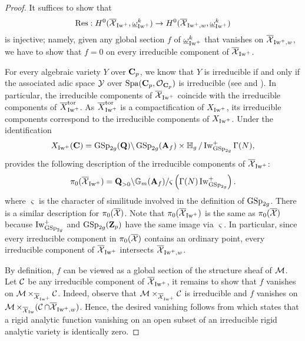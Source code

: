 \begin{proof}
It suffices to show that 
$$\Res: H^0(\overline{\calX}_{\Iw^+}, \underline{\omega}_{\Iw^+}^k)\rightarrow H^0(\overline{\calX}_{\Iw^+, w}, \underline{\omega}_{\Iw^+}^k)$$
is injective; namely, given any global section $f$ of $\underline{\omega}_{\Iw^+}^k$ that vanishes on $\overline{\calX}_{\Iw^+, w}$, we have to show that $f = 0$ on every irreducible component of $\overline{\calX}_{\Iw^+}$.

For every algebraic variety $Y$ over $\C_p$, we know that $Y$ is irreducible if and only if the associated adic space $\calY$ over $\Spa(\C_p, \calO_{\C_p})$ is irreducible (see \cite[Theorem 2.3.1]{conrad-conn} and \cite[\S 1.1.11.(c)]{Huber-2013}). In particular, the irreducible components of $\overline{\calX}_{\Iw^+}$ coincide with the irreducible components of $\overline{X}_{\Iw^+}^{\tor}$. As $\overline{X}_{\Iw^+}^{\tor}$ is a compactification of $X_{\Iw^+}$, its irreducible components correspond to the irreducible components of $X_{\Iw^+}$. Under the identification \[
    X_{\Iw^+}(\C) = \GSp_{2g}(\Q)\backslash \GSp_{2g}(\A_f)\times \bbH_g/\Iw_{\GSp_{2g}}^+\Gamma(N),
\] \cite[\S 2]{Deligne-Shimura} provides the following description of the irreducible components of $\overline{\calX}_{\Iw^+}$:
\[
\pi_0(\overline{\calX}_{\Iw^+}) =  {\Q_{>0}}\backslash \mathbb{G}_m(\A_f)/ \varsigma\left(\Gamma(N) \Iw_{\GSp_{2g}}^+\right).
\]
where $\varsigma$ is the character of similitude involved in the definition of $\GSp_{2g}$. There is a similar description for $\pi_0(\overline{\calX})$. Note that $\pi_0(\overline{\calX}_{\Iw^+})$ is the same as  $\pi_0(\overline{\calX})$ because $\Iw_{\GSp_{2g}}^+$ and $\GSp_{2g}(\Z_p)$ have the same image via $\varsigma$. In particular, since every irreducible component in $\pi_0(\overline{\calX})$ contains an ordinary point, every irreducible component of $\overline{\calX}_{\Iw^+}$ intersects $\overline{\calX}_{\Iw^+, w}$.

By definition, $f$ can be viewed as a global section of the structure sheaf of $\calM$. Let $\calC$ be any irreducible component of $\overline{\calX}_{\Iw^+}$, it remains to show that $f$ vanishes on $\calM \times_{\overline{\calX}_{\Iw^+}}\calC$. Indeed, observe that $\mathcal{M}\times_{\overline{\calX}_{\Iw^+}} {\mathcal{C}} $ is irreducible and $f$ vanishes on $\calM \times_{\overline{\calX}_{\Iw}}(\calC \cap \overline{\calX}_{\Iw^+, w})$. Hence, the desired vanishing follows from \cite[Proposition 0.1.13]{Berthelot-rigid_cohomology} which states that a rigid analytic function vanishing on an open subset of an irreducible rigid analytic variety is identically zero.
\end{proof}


